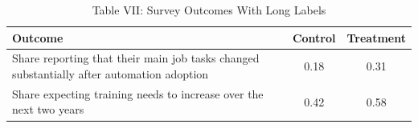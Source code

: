 \documentclass{article}
\begin{document}
\begin{table}[htbp]
\centering
\caption{Table VII: Survey Outcomes With Long Labels}
\begin{tabularx}{\textwidth}{Xcc}
\toprule
Outcome & Control & Treatment \\
\midrule
Share reporting that their main job tasks changed substantially after automation adoption & 0.18 & 0.31 \\
Share expecting training needs to increase over the next two years & 0.42 & 0.58 \\
\bottomrule
\end{tabularx}
\end{table}
\end{document}
